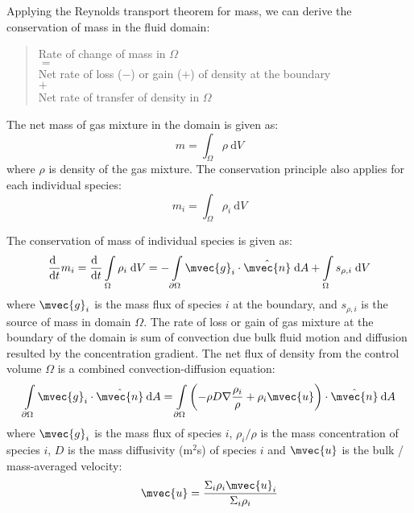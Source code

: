 Applying the Reynolds transport theorem for mass, we can derive the conservation of mass in the fluid domain:
\begin{quote}
	\centering
	Rate of change of mass in $\Omega$\\
	$=$\\
	Net rate of loss ($-$) or gain ($+$) of density at the boundary\\
	$+$\\
	Net rate of transfer of density in $\Omega$
\end{quote}

The net mass of gas mixture in the domain is given as:
\begin{equation}
m = \int_\Omega  \rho \:\mathrm{d}V
\end{equation}
where $\rho$ is density of the gas mixture. The conservation principle also applies for each individual species:
\begin{equation}
{m_i} = \int_\Omega  {{\rho _i}\:\mathrm{d}V}
\end{equation}

The conservation of mass of individual species is given as:
\begin{equation}
\frac{\mathrm{d}~}{\mathrm{d}t} {m_i} = \frac{\mathrm{d}~}{\mathrm{d}t} \int \limits_{\Omega} \rho_i\;\mathrm{d}V= - \int \limits_{\partial \Omega } \mvec{g}_i\cdot\hat{\mvec{n}}\;\mathrm{d}A + \int \limits_{\Omega} s_{\rho,i}\;\mathrm{d}V
\end{equation}
where $\mvec{g}_i$ is the mass flux of species $i$ at the boundary, and $s_{\rho,i}$ is the source of mass in domain $\Omega$. The rate of loss or gain of gas mixture at the boundary of the domain is sum of convection due bulk fluid motion and diffusion resulted by the concentration gradient. The net flux of density from the control volume $\Omega$ is a combined convection-diffusion equation:
\begin{equation}
\int \limits_{\partial \Omega } {{{\mvec{g}}_i}}  \cdot \hat{\mvec{n}}\:\mathrm{d}A = \int \limits_{\partial \Omega } {\left( { - {\rho}{D}\nabla \frac{{{\rho _i}}}{{{\rho}}} + {\rho _i}{\mvec{u}}} \right)}  \cdot \hat{\mvec{n}}\:\mathrm{d}A
\label{eq:masscde}
\end{equation}
where $\mvec{g}_i$ is the mass flux of species $i$, $\rho_i/\rho$ is the mass concentration of species $i$, $D$ is the mass diffusivity (m$^2$s) of species $i$ and $\mvec{u}$ is the bulk / mass-averaged velocity:
\begin{equation}
{\mvec{u}} = \frac{{{\Sigma _i}{\rho _i}{{\mvec{u}}_i}}}{{{\Sigma _i}{\rho _i}}}
\end{equation}

